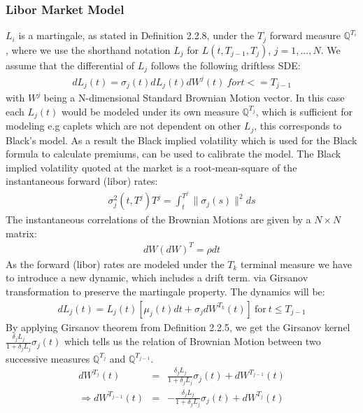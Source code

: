 \documentclass[11pt]{article}
\numberwithin{equation}{subsection}
\begin{document}
\subsubsection{Libor Market Model}
\(L_i\) is a martingale, as stated in Definition 2.2.8, under the \(T_{j}\) forward measure \(\mathbb{Q}^{T_i}\), where we use the shorthand notation \(L_{j}\) for \(L(t, T_{j-1}, T_{j})\), \(j=1,...,N\). We assume that the differential of \(L_{j}\) follows the following driftless SDE:
\begin{eqnarray}
	dL_{j}(t) = \sigma_{j}(t) dL_{j}(t)dW^{j}(t) \ for t <= T_{j-1}
\end{eqnarray}
with \(W^{j}\) being a N-dimensional Standard Brownian Motion vector. In this case each \(L_{j}(t)\) would be modeled under its own measure \(\mathbb{Q}^{T_j}\), which is sufficient for modeling e.g caplets which are not dependent on other \(L_{j}\), this corresponds to Black's model. As a result the Black implied volatility which is used for the Black formula to calculate premiums, can be used to calibrate the model. The Black implied volatility quoted at the market is a root-mean-square of the instantaneous forward (libor) rates:
\begin{eqnarray*}
	\sigma_{j}^{2}(t, T^j)T^j = \int_{t}^{T^j} \|\sigma_{j}(s)\|^{2} ds
\end{eqnarray*}
The instantaneous correlations of the Brownian Motions are given by a \(N \times N\) matrix:
\begin{eqnarray*}
	dW(dW)^{T} = \rho dt
\end{eqnarray*}
As the forward (libor) rates are modeled under the \(T_{k}\) terminal measure we have to introduce a new dynamic, which includes a drift term. via Girsanov transformation to preserve the martingale property. The dynamics will be:
\begin{eqnarray}
	dL_{j}(t) = L_{j}(t)[\mu_{j}(t)dt + \sigma_{j} dW^{T_k}(t)] \ \text{for} \ t \leq T_{j-1}
\end{eqnarray}
By applying Girsanov theorem from Definition 2.2.5, we get the Girsanov kernel \(\frac{\delta_{j}L_{j}}{1+\delta_{j}L_{j}}\sigma_{j}(t)\)  which tells us the relation of Brownian Motion between two successive measures \(\mathbb{Q}^{T_j}\) and \(\mathbb{Q}^{T_{j-1}}\).
\begin{eqnarray*}
	dW^{T_j}(t) &=& \frac{\delta_{j}L_{j}}{1+\delta_{j}L_{j}}\sigma_{j}(t) + dW^{T_{j-1}}(t) \\
	\Rightarrow dW^{T_{j-1}}(t) &=& -\frac{\delta_{j}L_{j}}{1+\delta_{j}L_{j}}\sigma_{j}(t) + dW^{T_{j}}(t)
\end{eqnarray*}
\end{document}
